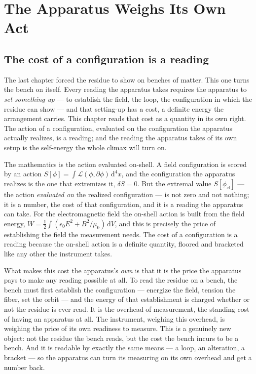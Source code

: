 \chapter{The Apparatus Weighs Its Own Act}

\section{The cost of a configuration is a reading}

The last chapter forced the residue to show on benches of matter. This one turns the bench on itself. Every reading the
apparatus takes requires the apparatus to \emph{set something up} --- to establish the field, the loop, the configuration in
which the residue can show --- and that setting-up has a cost, a definite energy the arrangement carries. This chapter reads
that cost as a quantity in its own right. The action of a configuration, evaluated on the configuration the apparatus
actually realizes, is a reading; and the reading the apparatus takes of its own setup is the self-energy the whole climax
will turn on.

The mathematics is the action evaluated on-shell. A field configuration is scored by an action $S[\phi] = \int
\mathcal{L}(\phi, \partial\phi)\,\mathrm{d}^4x$, and the configuration the apparatus realizes is the one that extremizes it,
$\delta S = 0$. But the extremal value $S[\phi_{\text{cl}}]$ --- the action \emph{evaluated on} the realized configuration ---
is not zero and not nothing; it is a number, the cost of that configuration, and it is a reading the apparatus can take. For
the electromagnetic field the on-shell action is built from the field energy, $W = \tfrac12\int (\epsilon_0 E^2 +
B^2/\mu_0)\,\mathrm{d}V$, and this is precisely the price of establishing the field the measurement needs. The cost of a
configuration is a reading because the on-shell action is a definite quantity, floored and bracketed like any other the
instrument takes.

What makes this cost the apparatus's \emph{own} is that it is the price the apparatus pays to make any reading possible at
all. To read the residue on a bench, the bench must first establish the configuration --- energize the field, tension the
fiber, set the orbit --- and the energy of that establishment is charged whether or not the residue is ever read. It is the
overhead of measurement, the standing cost of having an apparatus at all. The instrument, weighing this overhead, is weighing
the price of its own readiness to measure. This is a genuinely new object: not the residue the bench reads, but the cost the
bench incurs to be a bench. And it is readable by exactly the same means --- a loop, an alteration, a bracket --- so the
apparatus can turn its measuring on its own overhead and get a number back.

